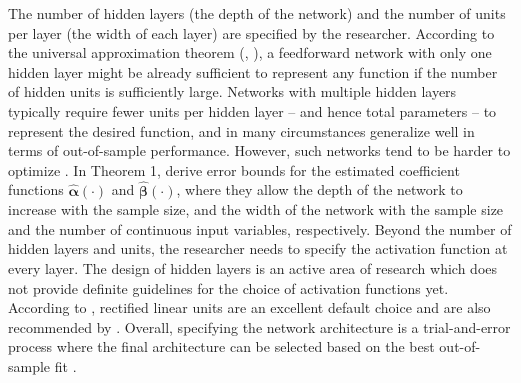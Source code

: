 \documentclass[a4paper, 12pt]{article}
\begin{document}
\begin{figure}[h]
\begin{center}
    \label{figDL:network_architecture}
\end{center}
\end{figure}

The number of hidden layers (the depth of the network) and the number of units per layer (the width of each layer) are specified by the researcher. 
According to the universal approximation theorem (, ), a feedforward network with only one hidden layer might be already sufficient to represent any function if the number of hidden units is sufficiently large. Networks with multiple hidden layers typically require fewer units per hidden layer -- and hence total parameters -- to represent the desired function, and in many circumstances generalize well in terms of out-of-sample performance. However, such networks tend to be harder to optimize \cite{goodfellow2016}. 
In Theorem 1,  derive error bounds for the estimated coefficient functions $\hat{\bm{\alpha}}(\cdot)$ and $\hat{\bm{\beta}}(\cdot)$, where they allow the depth of the network to increase with the sample size, and the width of the network with the sample size and the number of continuous input variables, respectively. 
Beyond the number of hidden layers and units, the researcher needs to specify the activation function at every layer. The design of hidden layers is an active area of research which does not provide definite guidelines for the choice of activation functions yet. According to , rectified linear units are an excellent default choice and are also recommended by .
Overall, specifying the network architecture is a trial-and-error process where the final architecture can be selected based on the best out-of-sample fit \cite{goodfellow2016}.
\end{document}
